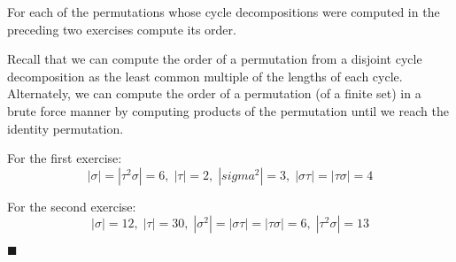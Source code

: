 \documentclass[12pt]{article}
\renewcommand{\qed}{\hfill$\blacksquare$}
\renewenvironment{proof}{\begin{addmargin}[1em]{0em}\begin{newproof}}{\end{newproof}\end{addmargin}\qed}
\newenvironment{problem}[2][Exercise]{\begin{trivlist}
\item[\hskip \labelsep {\bfseries #1}\hskip \labelsep {\bfseries #2.}]}{\end{trivlist}}
\begin{document}
\begin{problem}{1.3.3}
For each of the permutations whose cycle decompositions were computed in the preceding two exercises compute its order.
\end{problem}
\begin{proof}
Recall that we can compute the order of a permutation from a disjoint cycle decomposition as the least common multiple of the lengths of each cycle. Alternately, we can compute the order of a permutation (of a finite set) in a brute force manner by computing products of the permutation until we reach the identity permutation.

For the first exercise:
$$ \left|\sigma\right|=\left|\tau^2\sigma\right|=6, \; \left|\tau\right|=2, \; \left|sigma^2\right|=3, \; \left|\sigma \tau\right| = \left|\tau \sigma \right| = 4 $$

For the second exercise:
$$ \left|\sigma\right|=12, \; \left|\tau\right|=30, \; \left|\sigma^2\right|=\left|\sigma\tau\right|=\left|\tau\sigma\right| = 6, \; \left|\tau^2\sigma\right| = 13 $$
\end{proof}
\end{document}
